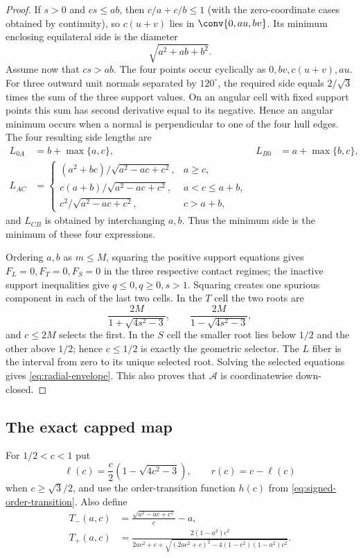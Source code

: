 \begin{proof}
If $s>0$ and $cs\le ab$, then $c/a+c/b\le1$ (with the zero-coordinate
cases obtained by continuity), so $c(u+v)$ lies in
$\conv\{0,au,bv\}$.  Its minimum enclosing equilateral side is the diameter
\[
 \sqrt{a^2+ab+b^2}.
\]
Assume now that $cs>ab$.  The four points occur cyclically as
$0,bv,c(u+v),au$.  For three outward unit normals separated by
$120^\circ$, the required side equals $2/\sqrt3$ times the sum of the three
support values.  On an angular cell with fixed support points this sum has
second derivative equal to its negative.  Hence an angular minimum occurs
when a normal is perpendicular to one of the four hull edges.  The four
resulting side lengths are
\begin{align*}
 L_{0A}&=b+\max\{a,c\},&
 L_{B0}&=a+\max\{b,c\},\\
 L_{AC}&=
 \begin{cases}
 (a^2+bc)/\sqrt{a^2-ac+c^2},&a\ge c,\\
 c(a+b)/\sqrt{a^2-ac+c^2},&a<c\le a+b,\\
 c^2/\sqrt{a^2-ac+c^2},&c>a+b,
 \end{cases}
\end{align*}
and $L_{CB}$ is obtained by interchanging $a,b$.  Thus the minimum side is
the minimum of these four expressions.

Ordering $a,b$ as $m\le M$, squaring the positive support equations gives
$F_L=0,F_T=0,F_S=0$ in the three respective contact regimes; the inactive
support inequalities give $q\le0,q\ge0,s>1$.  Squaring creates one spurious
component in each of the last two cells.  In the $T$ cell the two roots are
\[
 \frac{2M}{1+\sqrt{4s^2-3}},
 \qquad
 \frac{2M}{1-\sqrt{4s^2-3}},
\]
and $c\le2M$ selects the first.  In the $S$ cell the smaller root lies below
$1/2$ and the other above $1/2$; hence $c\le1/2$ is exactly the geometric
selector.  The $L$ fiber is the interval from zero to its unique selected
root.  Solving the selected equations gives \eqref{eq:radial-envelope}.
This also proves that $\mathcal A$ is coordinatewise down-closed.
\end{proof}

\subsection{The exact capped map}

For $1/2<c<1$ put
\[
 \ell(c)=\frac c2\left(1-\sqrt{4c^2-3}\right),\qquad
 r(c)=c-\ell(c)
\]
when $c\ge\sqrt3/2$, and
use the order-transition function $h(c)$ from
\eqref{eq:signed-order-transition}.
Also define
\begin{align*}
 T_-(a,c)&=\frac{\sqrt{a^2-ac+c^2}}c-a,\\
 T_+(a,c)&=
 \frac{2(1-a^2)c^2}
 {2ac^2+c+\sqrt{(2ac^2+c)^2-4(1-c^2)(1-a^2)c^2}}.
\end{align*}

